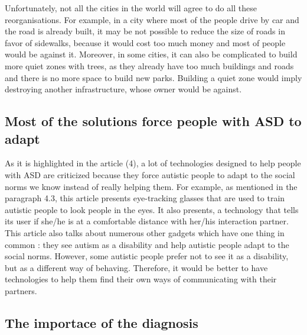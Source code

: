 Unfortunately, not all the cities in the world will agree to do all these reorganisations. For example, in a city where most of the people drive by car and the road is already built, it may be not possible to reduce the size of roads in favor of sidewalks, because it would cost too much money and most of people would be against it. Moreover, in some cities, it can also be complicated to build more quiet zones with trees, as they already have too much buildings and roads and there is no more space to build new parks. Building a quiet zone would imply destroying another infrastructure, whose owner would be against. 
\subsection{Most of the solutions force people with ASD to adapt}
As it is highlighted in the article (4), a lot of technologies designed to help people with ASD are criticized because they force autistic people to adapt to the social norms we know instead of really helping them. For example, as mentioned in the paragraph 4.3, this article presents eye-tracking glasses that are used to train autistic people to look people in the eyes. It also presents, a technology that tells its user if she/he is at a comfortable distance with her/his interaction partner. This article also talks about numerous other gadgets which have one thing in common : they see autism as a disability and help autistic people adapt to the social norms. However, some autistic people prefer not to see it as a disability, but as a different way of behaving. Therefore, it would be better to have technologies to help them find their own ways of communicating with their partners. 
\subsection{The importace of the diagnosis}
